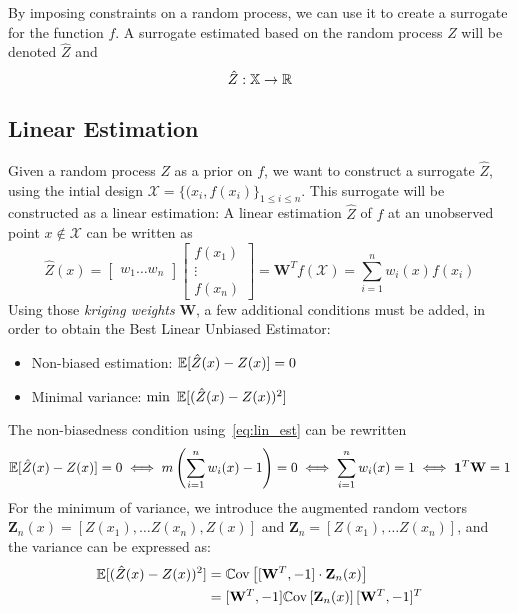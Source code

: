 \documentclass[../../Main_ManuscritThese.tex]{subfiles}
\begin{document}
By imposing constraints on a random process, we can use it to create a surrogate for the function $f$. A surrogate estimated based on the random process $Z$ will be denoted $\hat{Z}$ and
\begin{equation}
  \hat{Z}: \mathbb{X} \rightarrow \mathbb{R}
\end{equation}

\subsection{Linear Estimation}
\label{sec:linear_estimation}
Given a random process $Z$ as a prior on $f$, we want to construct a surrogate $\hat{Z}$, using the intial design $\mathcal{X} = \{(x_i, f(x_i)\}_{1 \leq i \leq n}$. This surrogate will be constructed as a linear estimation:
A linear estimation $\hat{Z}$ of $f$ at an unobserved point $x\notin \mathcal{X}$ can be written as
\begin{equation}
  \label{eq:lin_est}
  \hat{Z}(x) =
  \begin{bmatrix}
    w_1 \dots w_n
    \end{bmatrix}
    \begin{bmatrix}
      f(x_1) \\ \vdots \\ f(x_n)
    \end{bmatrix} = \mathbf{W}^Tf(\mathcal{X}) = \sum_{i=1}^n w_i(x) f(x_i)
\end{equation}
Using those \emph{kriging weights} $\mathbf{W}$, a few additional conditions must be added, in order to obtain the Best Linear Unbiased Estimator:
\begin{itemize}
\item Non-biased estimation: $\mathbb{E}[\hat{Z}(x) - Z(x)]=0$
\item Minimal variance: $\min~\mathbb{E}[(\hat{Z}(x) - Z(x))^2]$
\end{itemize}
The non-biasedness condition using~\cref{eq:lin_est} can be rewritten
\begin{equation}
  \mathbb{E}[\hat{Z}(x) - Z(x)]=0 \iff m\left(\sum_{i=1}^n w_i(x)-1\right) = 0 \iff \sum_{i=1}^n w_i(x) = 1 \iff \mathbf{1}^T \mathbf{W} = 1
\end{equation}
For the minimum of variance, we introduce the augmented random vectors $\mathbf{Z}_n(x) = [Z(x_1),\dots Z(x_n), Z(x)]$ and $\mathbf{Z}_n = [Z(x_1),\dots Z(x_n)]$, and
the variance can be expressed as:
\begin{align}
  \mathbb{E}[(\hat{Z}(x) - Z(x))^2] &= \mathbb{C}\mathrm{ov}\left[[\mathbf{W}^T, -1] \cdot \mathbf{Z}_n(x) \right] \\
                             &= [\mathbf{W}^T, -1] \mathbb{C}\mathrm{ov}\left[\mathbf{Z}_n(x) \right] [\mathbf{W}^T, -1]^T
\end{align}
\end{document}
